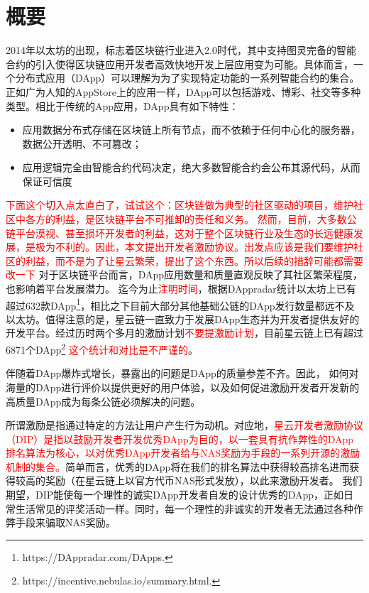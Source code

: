 \section{概要}


2014年以太坊的出现，标志着区块链行业进入2.0时代\cite{buterin2014next}，其中支持图灵完备的智能合约的引入使得区块链应用开发者高效快地开发上层应用变为可能。具体而言，一个分布式应用（DApp）可以理解为为了实现特定功能的一系列智能合约的集合。正如广为人知的AppStore上的应用一样，DApp可以包括游戏、博彩、社交等多种类型。相比于传统的App应用，DApp具有如下特性：

\begin{itemize}
	\item 应用数据分布式存储在区块链上所有节点，而不依赖于任何中心化的服务器，数据公开透明、不可篡改；
	\item 应用逻辑完全由智能合约代码决定，绝大多数智能合约会公布其源代码，从而保证可信度
\end{itemize}

\textcolor{red}{下面这个切入点太直白了，试试这个：区块链做为典型的社区驱动的项目，维护社区中各方的利益，是区块链平台不可推卸的责任和义务。
然而，目前，大多数公链平台漠视、甚至损坏开发者的利益，这对于整个区块链行业及生态的长远健康发展，是极为不利的。因此，本文提出开发者激励协议。出发点应该是我们要维护社区的利益，而不是为了让星云繁荣，提出了这个东西。所以后续的措辞可能都需要改一下}
对于区块链平台而言，DApp应用数量和质量直观反映了其社区繁荣程度，也影响着平台发展潜力。
迄今为止\textcolor{red}{注明时间}，根据DAppradar统计以太坊上已有超过632款DApp\footnote{https://DAppradar.com/DApps.}，相比之下目前大部分其他基础公链的DApp发行数量都远不及以太坊。值得注意的是，星云链一直致力于发展DApp生态并为开发者提供友好的开发平台。经过历时两个多月的激励计划\textcolor{red}{不要提激励计划}，目前星云链上已有超过6871个DApp\footnote{https://incentive.nebulas.io/summary.html.} \textcolor{red}{这个统计和对比是不严谨的}。

伴随着DApp爆炸式增长，暴露出的问题是DApp的质量参差不齐。因此，
如何对海量的DApp进行评价以提供更好的用户体验，以及如何促进激励开发者开发新的高质量DApp成为每条公链必须解决的问题。


所谓激励是指通过特定的方法让用户产生行为动机。对应地，\textcolor{red}{星云开发者激励协议（DIP）是指以鼓励开发者开发优秀DApp为目的，以一套具有抗作弊性的DApp排名算法为核心，以对优秀DApp开发者给与NAS奖励为手段的一系列开源的激励机制的集合。}简单而言，优秀的DApp将在我们的排名算法中获得较高排名进而获得较高的奖励（在星云链上以官方代币NAS形式发放），以此来激励开发者。 我们期望，DIP能使每一个理性的诚实DApp开发者自发的设计优秀的DApp，正如日常生活常见的评奖活动一样。同时，每一个理性的非诚实的开发者无法通过各种作弊手段来骗取NAS奖励。


